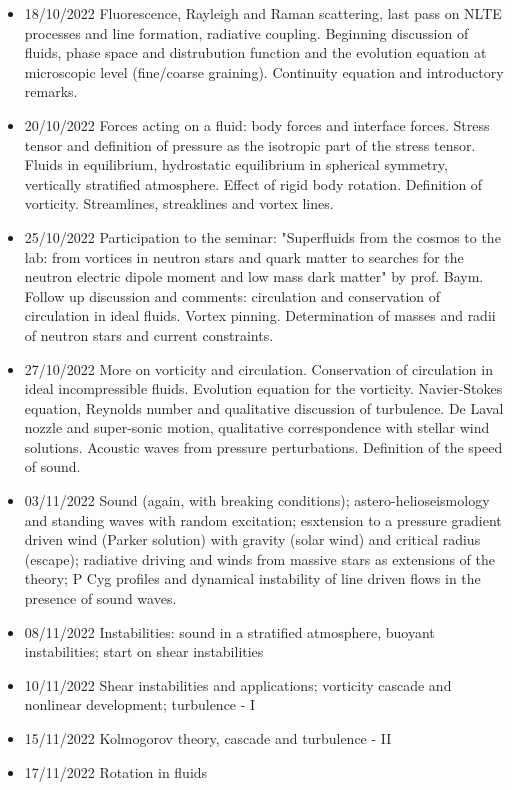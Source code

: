 \begin{itemize}
    \item 18/10/2022 Fluorescence, Rayleigh and Raman scattering, last pass on NLTE processes and line formation, radiative coupling. Beginning discussion of fluids, phase space and distrubution function and the evolution equation at microscopic level (fine/coarse graining). Continuity equation and introductory remarks. 
    \item 20/10/2022 Forces acting on a fluid: body forces and interface forces. Stress tensor and definition of pressure as the isotropic part of the stress tensor. Fluids in equilibrium, hydrostatic equilibrium in spherical symmetry, vertically stratified atmosphere. Effect of rigid body rotation. Definition of vorticity. Streamlines, streaklines and vortex lines. 
    \item 25/10/2022 Participation to the seminar: "Superfluids from the cosmos to the lab: from vortices in neutron stars and quark matter to searches for the neutron electric dipole moment and low mass dark matter" by prof. Baym. Follow up discussion and comments: circulation and conservation of circulation in ideal fluids. Vortex pinning. Determination of masses and radii of neutron stars and current constraints. 
    \item 27/10/2022 More on vorticity and circulation. Conservation of circulation in ideal incompressible fluids. Evolution equation for the vorticity. Navier-Stokes equation, Reynolds number and qualitative discussion of turbulence. De Laval nozzle and super-sonic motion, qualitative correspondence with stellar wind solutions. Acoustic waves from pressure perturbations. Definition of the speed of sound. 
    \item 03/11/2022 Sound (again, with breaking conditions); astero-helioseismology and standing waves with random excitation; esxtension to a pressure gradient driven wind (Parker solution) with gravity (solar wind) and critical radius (escape); radiative driving and winds from massive stars as extensions of the theory; P Cyg profiles and dynamical instability of line driven flows in the presence of sound waves. 
    \item 08/11/2022 Instabilities: sound in a stratified atmosphere, buoyant instabilities; start on shear instabilities 
    \item 10/11/2022 Shear instabilities and applications; vorticity cascade and nonlinear development; turbulence - I 
    \item 15/11/2022 Kolmogorov theory, cascade and turbulence - II 
    \item 17/11/2022 Rotation in fluids 

\end{itemize}
